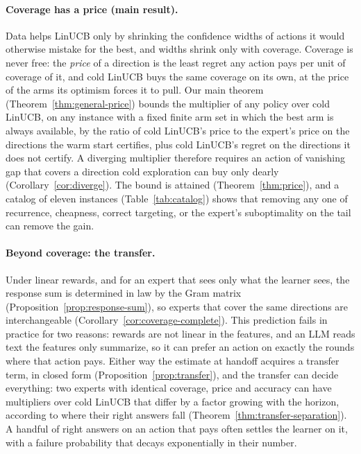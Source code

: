 \documentclass{article}
\theoremstyle{definition}
\theoremstyle{remark}
\theoremstyle{remark}
\begin{document}
\paragraph{Coverage has a price (main result).}
Data helps LinUCB only by shrinking the confidence widths of actions it would
otherwise mistake for the best, and widths shrink only with coverage.
Coverage is never free: the \emph{price} of a direction is the least regret
any action pays per unit of coverage of it, and cold LinUCB buys the same
coverage on its own, at the price of the arms its optimism forces it to pull.
Our main theorem (Theorem~\ref{thm:general-price}) bounds the multiplier of
any policy over cold LinUCB, on any instance with a fixed finite arm set in
which the best arm is always available, by the ratio of cold LinUCB's price
to the expert's price on the directions the warm start certifies, plus cold
LinUCB's regret on the directions it does not certify. A diverging multiplier
therefore requires an action of vanishing gap that covers a direction cold
exploration can buy only dearly (Corollary~\ref{cor:diverge}). The bound is
attained (Theorem~\ref{thm:price}), and a catalog of eleven instances
(Table~\ref{tab:catalog}) shows that removing any one of recurrence,
cheapness, correct targeting, or the expert's suboptimality on the tail can
remove the gain.

\paragraph{Beyond coverage: the transfer.}
Under linear rewards, and for an expert that sees only what the learner
sees, the response sum is determined in law by the Gram matrix
(Proposition~\ref{prop:response-sum}), so experts that cover the same
directions are interchangeable (Corollary~\ref{cor:coverage-complete}). This
prediction fails in practice for two reasons: rewards are not linear in the
features, and an LLM reads text the features only summarize, so it can prefer
an action on exactly the rounds where that action pays. Either way the
estimate at handoff acquires a transfer term, in closed form
(Proposition~\ref{prop:transfer}), and the transfer can decide everything:
two experts with identical coverage, price and accuracy can have multipliers
over cold LinUCB that differ by a factor growing with the horizon, according
to where their right answers fall (Theorem~\ref{thm:transfer-separation}). A
handful of right answers on an action that pays often settles the learner on
it, with a failure probability that decays exponentially in their number.
\end{document}
